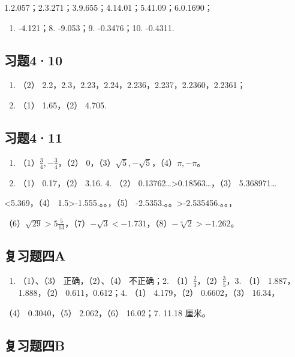 1.2.057；2.3.271；3.9.655；4.14.01；5.41.09；6.0.1690；

\begin{enumerate}[start=7]
\item
  -4.121；8. -9.053；9. -0.3476；10. -0.4311.
\end{enumerate}

\subsection{习题4·10}

\begin{enumerate}[start=3]
\item
  （2） 2.2，2.3，2.23，2.24，2.236，2.237，2.2360，2.2361；
\item
  （1） 1.65，（2） 4.705.
\end{enumerate}

\subsection{习题4·11}

\begin{enumerate}[start=2]
\item
  （1）\(\frac{3}{4}, -\frac{3}{4}\)，（2）
  0，（3）\(\sqrt{5}, -\sqrt{5}\)，（4）\(\pi, -\pi\)。
\item
  （1） 0.17，（2） 3.16. 4. （2）
  0.13762\ldots\textgreater0.18563\ldots，（3） 5.368971\ldots{}
\end{enumerate}

\textless5.369，（4） 1.5\textgreater-1.555.。。，（5）
-2.5353.。。\textgreater-2.535456.。。，

（6）\(\sqrt{29} > 5\frac{5}{13}\)，（7）\(-\sqrt{3} < -1.731\)，（8）\(-\sqrt[4]{2} > -1.262\)。

\subsection{复习题四A}

\begin{enumerate}
\item
  （1）、（3） 正确，（2）、（4） 不正确；2.
  （1）\(\frac{2}{3}\)，（2）\(\frac{3}{5}\)，3. （1）
  1.887，1.888，（2） 0.611，0.612；4. （1） 4.179，（2） 0.6602，（3）
  16.34，
\end{enumerate}

（4） 0.3040，（5） 2.062，（6） 16.02；7. 11.18 厘米。

\subsection{复习题四B}

